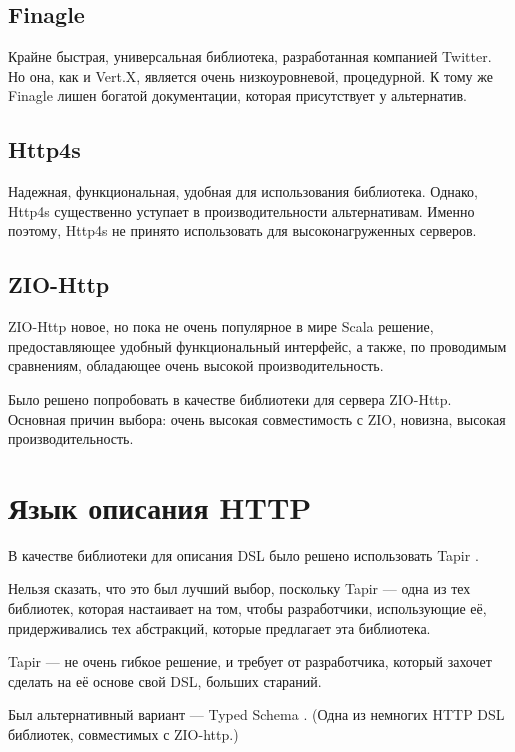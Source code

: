 \documentclass[14pt]{extarticle}
\begin{document}
    \subsection*{Finagle\cite{finagle}}
    Крайне быстрая, универсальная библиотека, разработанная компанией Twitter. Но она, как и Vert.X, является очень
    низкоуровневой, процедурной. К тому же Finagle лишен богатой документации, которая присутствует у альтернатив.

    \subsection*{Http4s\cite{http4s}}
    Надежная, функциональная, удобная для использования библиотека. Однако, Http4s существенно уступает в производительности
    альтернативам.
    Именно поэтому, Http4s не принято использовать для высоконагруженных серверов.

    \subsection*{ZIO-Http\cite{ziohttp}}

    ZIO-Http новое, но пока не очень популярное в мире Scala решение,
    предоставляющее удобный
    функциональный
    интерфейс, а
    также, по проводимым сравнениям, обладающее очень высокой производительность.

    Было решено попробовать в качестве библиотеки для сервера ZIO-Http. Основная причин выбора: очень высокая
    совместимость с ZIO, новизна, высокая производительность.


    \section{Язык описания HTTP}

    В качестве библиотеки для описания DSL было решено использовать Tapir \cite{tapir}.

    Нельзя сказать, что это был лучший выбор, поскольку Tapir --- одна из тех библиотек, которая настаивает на том,
    чтобы разработчики, использующие её, придерживались тех абстракций, которые предлагает
    эта библиотека.

    Tapir --- не очень гибкое решение, и требует от разработчика, который захочет сделать на её основе свой DSL, больших
    стараний.

    Был альтернативный вариант --- Typed Schema \cite{ts}. (Одна из немногих HTTP DSL библиотек, совместимых с ZIO-http.)
\end{document}
